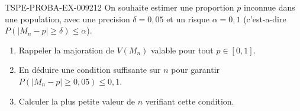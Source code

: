 \begin{exercice}{TSPE-PROBA-EX-009}{2}{12}
On souhaite estimer une proportion $p$ inconnue dans une population, avec une precision $\delta=0{,}05$ et un risque $\alpha=0{,}1$ (c'est-a-dire $P(|M_n-p|\geq\delta)\leq\alpha$).
\begin{enumerate}
  \item Rappeler la majoration de $V(M_n)$ valable pour tout $p \in [0,1]$.
  \item En déduire une condition suffisante sur $n$ pour garantir $P(|M_n-p|\geq0{,}05)\leq0{,}1$.
  \item Calculer la plus petite valeur de $n$ verifiant cette condition.
\end{enumerate}
\end{exercice}
